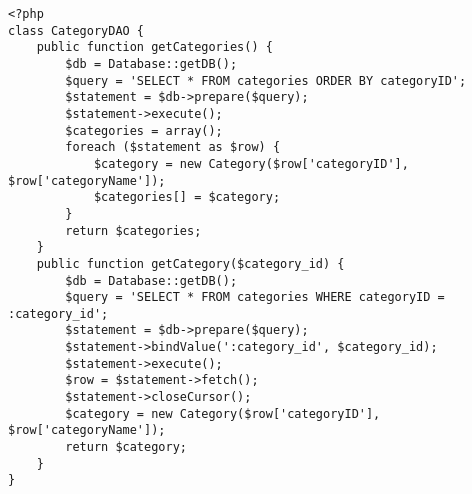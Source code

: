 \lstset{language=php, tabsize=2}
\begin{lstlisting}
<?php
class CategoryDAO {
    public function getCategories() {
        $db = Database::getDB();
        $query = 'SELECT * FROM categories ORDER BY categoryID';
        $statement = $db->prepare($query);
        $statement->execute();
        $categories = array();
        foreach ($statement as $row) {
            $category = new Category($row['categoryID'], $row['categoryName']);
            $categories[] = $category;
        }
        return $categories;
    }
    public function getCategory($category_id) {
        $db = Database::getDB();
        $query = 'SELECT * FROM categories WHERE categoryID = :category_id';
        $statement = $db->prepare($query);
        $statement->bindValue(':category_id', $category_id);
        $statement->execute();
        $row = $statement->fetch();
        $statement->closeCursor();
        $category = new Category($row['categoryID'], $row['categoryName']);
        return $category;
    }
}
\end{lstlisting}

